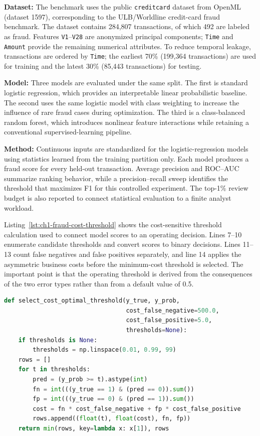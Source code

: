 \textbf{Dataset:} The benchmark uses the public \texttt{creditcard} dataset from OpenML (dataset 1597), corresponding to the ULB/Worldline credit-card fraud benchmark. The dataset contains 284,807 transactions, of which 492 are labeled as fraud. Features \texttt{V1}--\texttt{V28} are anonymized principal components; \texttt{Time} and \texttt{Amount} provide the remaining numerical attributes. To reduce temporal leakage, transactions are ordered by \texttt{Time}; the earliest 70\% (199,364 transactions) are used for training and the latest 30\% (85,443 transactions) for testing.

\textbf{Model:} Three models are evaluated under the same split. The first is standard logistic regression, which provides an interpretable linear probabilistic baseline. The second uses the same logistic model with class weighting to increase the influence of rare fraud cases during optimization. The third is a class-balanced random forest, which introduces nonlinear feature interactions while retaining a conventional supervised-learning pipeline.

\textbf{Method:} Continuous inputs are standardized for the logistic-regression models using statistics learned from the training partition only. Each model produces a fraud score for every held-out transaction. Average precision and ROC--AUC summarize ranking behavior, while a precision--recall sweep identifies the threshold that maximizes F1 for this controlled experiment. The top-1\% review budget is also reported to connect statistical evaluation to a finite analyst workload.

Listing~\ref{lst:ch1-fraud-cost-threshold} shows the cost-sensitive threshold calculation used to connect model scores to an operating decision. Lines 7--10 enumerate candidate thresholds and convert scores to binary decisions. Lines 11--13 count false negatives and false positives separately, and line 14 applies the asymmetric business costs before the minimum-cost threshold is selected. The important point is that the operating threshold is derived from the consequences of the two error types rather than from a default value of 0.5.

\begin{lstlisting}[style=BookCode,language=Python,caption={Cost-sensitive threshold selection for a fraud classifier.},label={lst:ch1-fraud-cost-threshold}]
def select_cost_optimal_threshold(y_true, y_prob,
                                  cost_false_negative=500.0,
                                  cost_false_positive=5.0,
                                  thresholds=None):
    if thresholds is None:
        thresholds = np.linspace(0.01, 0.99, 99)
    rows = []
    for t in thresholds:
        pred = (y_prob >= t).astype(int)
        fn = int(((y_true == 1) & (pred == 0)).sum())
        fp = int(((y_true == 0) & (pred == 1)).sum())
        cost = fn * cost_false_negative + fp * cost_false_positive
        rows.append((float(t), float(cost), fn, fp))
    return min(rows, key=lambda x: x[1]), rows
\end{lstlisting}


